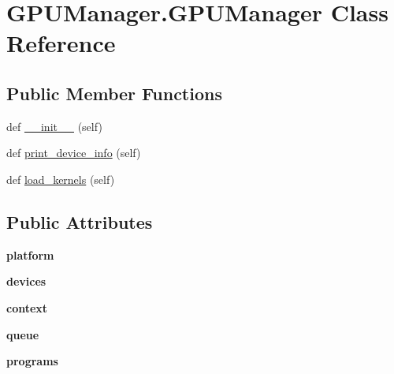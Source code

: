 \hypertarget{class_g_p_u_manager_1_1_g_p_u_manager}{}\section{G\+P\+U\+Manager.\+G\+P\+U\+Manager Class Reference}
\label{class_g_p_u_manager_1_1_g_p_u_manager}
\subsection*{Public Member Functions}
\begin{DoxyCompactItemize}
\item 
def \hyperlink{class_g_p_u_manager_1_1_g_p_u_manager_aaa00d0d2f90d9cb6bab88f873d3e1261}{\+\_\+\+\_\+init\+\_\+\+\_\+} (self)
\item 
def \hyperlink{class_g_p_u_manager_1_1_g_p_u_manager_a936c21f2d21ae94b581636e9255e71df}{print\+\_\+device\+\_\+info} (self)
\item 
def \hyperlink{class_g_p_u_manager_1_1_g_p_u_manager_a95ccd16d4a81b00946d87f91bdca27e9}{load\+\_\+kernels} (self)
\end{DoxyCompactItemize}
\subsection*{Public Attributes}
\begin{DoxyCompactItemize}
\item 
\mbox{\label{class_g_p_u_manager_1_1_g_p_u_manager_ae95df47a91b17aa5a9f045efd0547416}} 
{\bfseries platform}
\item 
\mbox{\label{class_g_p_u_manager_1_1_g_p_u_manager_aec4090621f66cd5d003c6c4d6a40ccaa}} 
{\bfseries devices}
\item 
\mbox{\label{class_g_p_u_manager_1_1_g_p_u_manager_a6c40884972be2350ea61b03a11339354}} 
{\bfseries context}
\item 
\mbox{\label{class_g_p_u_manager_1_1_g_p_u_manager_ad4d3c25e7aa7a1ecf7683d6c3a4a3350}} 
{\bfseries queue}
\item 
\mbox{\label{class_g_p_u_manager_1_1_g_p_u_manager_ae25153bc81d73a1744fa80d8c994ee06}} 
{\bfseries programs}
\end{DoxyCompactItemize}



